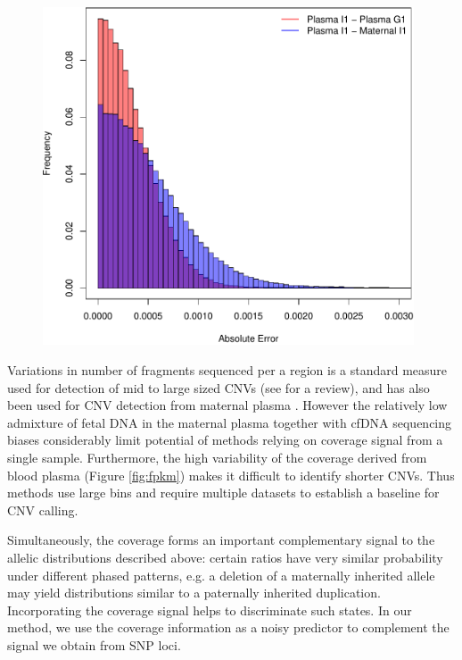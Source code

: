 \begin{figure}
{\begin{minipage}[b]{0.48\textwidth}
	\includegraphics[width=0.98\textwidth]{figures/wrv_error_histo}
	\end{minipage}	
}
\end{figure}

Variations in number of fragments sequenced per a region is a standard measure used for detection of mid to large sized CNVs (see \cite{medvedev2009} for a review), and has also been used for CNV detection from maternal plasma \citep{srinivasan2013, chen2013}. However the relatively low admixture of fetal DNA in the maternal plasma together with cfDNA sequencing biases considerably limit potential of methods relying on coverage signal from a single sample. Furthermore, the high variability of the coverage derived from blood plasma (Figure \ref{fig:fpkm}) makes it difficult to identify shorter CNVs. Thus methods \cite{srinivasan2013, chen2013} use large bins and require multiple datasets to establish a baseline for CNV calling.

Simultaneously, the coverage forms an important complementary signal to the allelic distributions described above: certain ratios have very similar probability under different phased patterns, e.g. a deletion of a maternally inherited allele may yield distributions similar to a paternally inherited duplication. Incorporating the coverage signal helps to discriminate such states. In our method, we use the coverage information as a noisy predictor to complement the signal we obtain from SNP loci.

